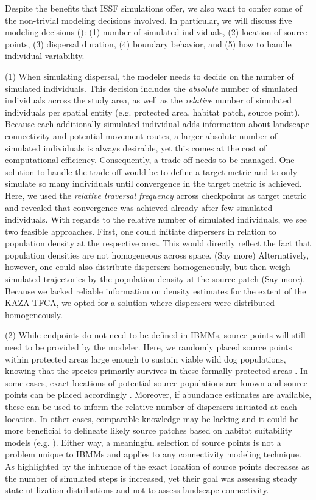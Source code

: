\documentclass[abstract=on,10pt,a4paper,bibliography=totocnumbered]{article}
\begin{document}
Despite the benefits that ISSF simulations offer, we also want to confer some of
the non-trivial modeling decisions involved. In particular, we will discuss five
modeling decisions (): (1) number of simulated
individuals, (2) location of source points, (3) dispersal duration, (4) boundary
behavior, and (5) how to handle individual variability.

(1) When simulating dispersal, the modeler needs to decide on the number of
simulated individuals. This decision includes the \textit{absolute} number of
simulated individuals across the study area, as well as the \textit{relative}
number of simulated individuals per spatial entity (e.g. protected area, habitat
patch, source point). Because each additionally simulated individual adds
information about landscape connectivity and potential movement routes, a larger
absolute number of simulated individuals is always desirable, yet this comes at
the cost of computational efficiency. Consequently, a trade-off needs to be
managed. One solution to handle the trade-off would be to define a target metric
and to only simulate so many individuals until convergence in the target metric
is achieved. Here, we used the \textit{relative traversal frequency} across
checkpoints as target metric and revealed that convergence was achieved already
after few simulated individuals. With regards to the relative number of
simulated individuals, we see two feasible approaches. First, one could initiate
dispersers in relation to population density at the respective area. This would
directly reflect the fact that population densities are not homogeneous across
space. (Say more) Alternatively, however, one could also distribute dispersers
homogeneously, but then weigh simulated trajectories by the population density
at the source patch (Say more). Because we lacked reliable information on
density estimates for the extent of the KAZA-TFCA, we opted for a solution where
dispersers were distributed homogeneously.

(2) While endpoints do not need to be defined in IBMMs, source points will still
need to be provided by the modeler. Here, we randomly placed source points
within protected areas large enough to sustain viable wild dog populations,
knowing that the species primarily survives in these formally protected areas
\citep{Woodroffe.1999, DaviesMostert.2012, Woodroffe.2012, VanDerMeer.2014}. In
some cases, exact locations of potential source populations are known and source
points can be placed accordingly \citep{Kanagaraj.2013}. Moreover, if abundance
estimates are available, these can be used to inform the relative number of
dispersers initiated at each location. In other cases, comparable knowledge may
be lacking and it could be more beneficial to delineate likely source patches
based on habitat suitability models (e.g. \citealp{Squires.2013}). Either way, a
meaningful selection of source points is not a problem unique to IBMMs and
applies to any connectivity modeling technique. As highlighted by
\cite{Signer.2017} the influence of the exact location of source points
decreases as the number of simulated steps is increased, yet their goal was
assessing steady state utilization distributions and not to assess landscape
connectivity.
\end{document}
